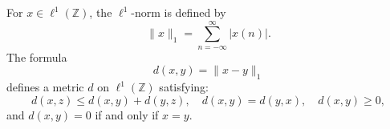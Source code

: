 For $x \in \ell^1(\mathbb{Z})$, the $\ell^1$-norm is defined by
$$\|x\|_1 = \sum_{n=-\infty}^{\infty} |x(n)|.$$
The formula
$$d(x, y) = \|x - y\|_1$$
defines a metric $d$ on $\ell^1(\mathbb{Z})$ satisfying:
$$d(x, z) \leq d(x, y) + d(y, z), \quad d(x, y) = d(y, x), \quad d(x, y) \geq 0,$$
and $d(x, y) = 0$ if and only if $x = y$.
